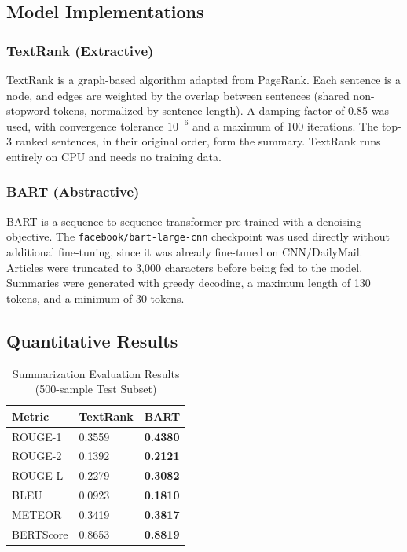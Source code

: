 \documentclass[12pt,a4paper]{article}
\begin{document}
\subsection{Model Implementations}

\subsubsection{TextRank (Extractive)}

TextRank \cite{mihalcea2004textrank} is a graph-based algorithm adapted from
PageRank. Each sentence is a node, and edges are weighted by the overlap between
sentences (shared non-stopword tokens, normalized by sentence length). A damping
factor of 0.85 was used, with convergence tolerance $10^{-6}$ and a maximum of
100 iterations. The top-3 ranked sentences, in their original order, form the
summary. TextRank runs entirely on CPU and needs no training data.

\subsubsection{BART (Abstractive)}

BART \cite{lewis2020bart} is a sequence-to-sequence transformer pre-trained
with a denoising objective. The \texttt{facebook/bart-large-cnn} checkpoint was
used directly without additional fine-tuning, since it was already fine-tuned
on CNN/DailyMail. Articles were truncated to 3{,}000 characters before being
fed to the model. Summaries were generated with greedy decoding, a maximum
length of 130 tokens, and a minimum of 30 tokens.

\subsection{Quantitative Results}

\begin{table}[H]
    \centering
    \caption{Summarization Evaluation Results (500-sample Test Subset)}
    \begin{tabular}{lC{2cm}C{2cm}}
        \toprule
        \textbf{Metric} & \textbf{TextRank} & \textbf{BART} \\
        \midrule
        ROUGE-1   & 0.3559 & \textbf{0.4380} \\
        ROUGE-2   & 0.1392 & \textbf{0.2121} \\
        ROUGE-L   & 0.2279 & \textbf{0.3082} \\
        BLEU      & 0.0923 & \textbf{0.1810} \\
        METEOR    & 0.3419 & \textbf{0.3817} \\
        BERTScore & 0.8653 & \textbf{0.8819} \\
        \bottomrule
    \end{tabular}
    \label{tab:q3_results}
\end{table}
\end{document}
